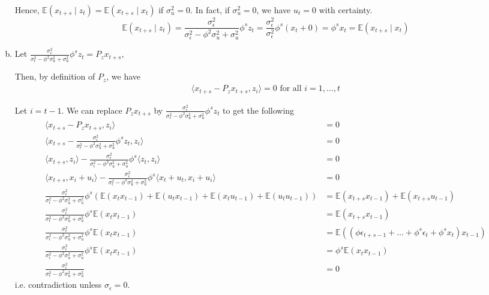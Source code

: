 \documentclass[12pt]{article}
\theoremstyle{definition}
\newcommand\E{\mathbb{E}}
\newcommand{\inp}[2]{\langle #1, #2 \rangle}
\begin{document}
\begin{enumerate}[(a)]
	Hence, $\E(x_{t+s}\mid z_t)=\E(x_{t+s}\mid x_t)$ if $\sigma_u^2=0$. In fact, if $\sigma_u^2=0$, we have $u_t=0$ with certainty.
	\[
	\E(x_{t+s}\mid z_t) = \frac{\sigma_\epsilon^2}{\sigma_\epsilon^2-\phi^2\sigma_u^2 + \sigma_u^2}\phi^sz_t = \frac{\sigma_\epsilon^2}{\sigma_\epsilon^2}\phi^s(x_t+0) = \phi^s x_t = \E(x_{t+s}\mid x_t) 
	\]
	\item
	
	Let $\frac{\sigma_\epsilon^2}{\sigma_\epsilon^2-\phi^2\sigma_u^2 + \sigma_u^2}\phi^s z_t = P_z x_{t+s}$,
	
	Then, by definition of $P_z$, we have
	\begin{align*}
		\inp{x_{t+s}-P_zx_{t+s}}{z_i} = 0 \text{ for all }i=1,\dots,t
	\end{align*}
	
	Let $i=t-1$. We can replace $P_z x_{t+s}$ by $\frac{\sigma_\epsilon^2}{\sigma_\epsilon^2-\phi^2\sigma_u^2 + \sigma_u^2}\phi^s z_t$ to get the following
	\begin{align*}
		\inp{x_{t+s}-P_zx_{t+s}}{z_i} & = 0 \\
			\inp{x_{t+s}-\frac{\sigma_\epsilon^2}{\sigma_\epsilon^2-\phi^2\sigma_u^2 + \sigma_u^2}\phi^s z_t}{z_i} & = 0 \\
			\inp{x_{t+s}}{z_i}-\frac{\sigma_\epsilon^2}{\sigma_\epsilon^2-\phi^2\sigma_u^2 + \sigma_u^2}\phi^s\inp{ z_t}{z_i} & = 0 \\
			\inp{x_{t+s}}{x_i+u_i}-\frac{\sigma_\epsilon^2}{\sigma_\epsilon^2-\phi^2\sigma_u^2 + \sigma_u^2}\phi^s\inp{ x_t+u_t}{x_i+u_i} & = 0 \\
			\frac{\sigma_\epsilon^2}{\sigma_\epsilon^2-\phi^2\sigma_u^2 + \sigma_u^2}\phi^s\left(\E(x_tx_{t-1}) + \E(u_tx_{t-1}) + \E(x_tu_{t-1}) +\E(u_tu_{t-1}) \right) & = \E(x_{t+s}x_{t-1})+\E(x_{t+s}u_{t-1}) \\
		\frac{\sigma_\epsilon^2}{\sigma_\epsilon^2-\phi^2\sigma_u^2 + \sigma_u^2}\phi^s \E(x_tx_{t-1}) & = \E(x_{t+s}x_{t-1})\\
			\frac{\sigma_\epsilon^2}{\sigma_\epsilon^2-\phi^2\sigma_u^2 + \sigma_u^2}\phi^s \E(x_tx_{t-1}) & = \E((\phi \epsilon_{t+s-1} + \dots + \phi^{s}\epsilon_{t} +  \phi^{s}x_{t}) x_{t-1})\\
					\frac{\sigma_\epsilon^2}{\sigma_\epsilon^2-\phi^2\sigma_u^2 + \sigma_u^2}\phi^s \E(x_tx_{t-1}) & = \phi^s \E(x_tx_{t-1})\\
					\frac{\sigma_\epsilon^2}{\sigma_\epsilon^2-\phi^2\sigma_u^2 + \sigma_u^2} & = 0
	\end{align*}
	i.e. contradiction unless $\sigma_\epsilon=0$.
	
\end{enumerate}
\end{document}
